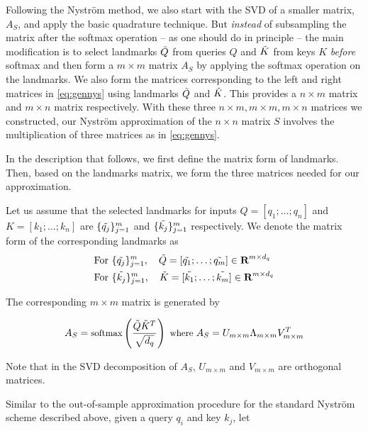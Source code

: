 Following the Nystr\"{o}m method, we also start with the SVD of a smaller matrix, $A_S$, and apply the basic quadrature technique. But {\em instead} of subsampling the matrix after the softmax operation -- as one should do in principle -- the main modification is to select landmarks $\Tilde{Q}$ from queries $Q$ and $\Tilde{K}$ from keys $K$ {\em before} softmax and then form a $m\times m$ matrix $A_S$ by applying the softmax operation on the landmarks. We also form the matrices corresponding to the left and right matrices in \eqref{eq:gennys} 
using landmarks $\Tilde{Q}$ and $\Tilde{K}$. 
This provides a $n\times m$ matrix and $m\times n$ matrix respectively. With these three $n\times m, m \times m, m \times n$ matrices we constructed, our Nystr\"{o}m approximation of the $n\times n$ matrix $S$ involves the multiplication of three matrices as in \eqref{eq:gennys}. 

In the description that follows, we first define the matrix form of landmarks. Then, based on the landmarks matrix, we form the three matrices needed for our approximation.

\begin{definition}
Let us assume that the selected landmarks for inputs $Q = [q_1; \dots; q_n]$ and $K = [k_1; \dots; k_n]$ are $\{\Tilde{q_j}\}_{j = 1}^m$ and $\{\Tilde{k_j}\}_{j = 1}^m$ respectively. We denote the matrix form of the corresponding landmarks as 
\begin{align*}
\small
&\text{For } \{\Tilde{q_j}\}_{j = 1}^m, \quad \Tilde{Q} = [\Tilde{q_1}; \dots; \Tilde{q_m}] \in \textbf{R}^{m \times d_q}\\
&\text{For } \{\Tilde{k_j}\}_{j = 1}^m, \quad \Tilde{K} = [\Tilde{k_1}; \dots; \Tilde{k_m}] \in \textbf{R}^{m \times d_q}    
\end{align*}
\end{definition}

 

The corresponding $m\times m$ matrix is generated by

\begin{equation*}
\small
A_S = \text{softmax}\left(\frac{\Tilde{Q}\Tilde{K}^T}{\sqrt{d_q}} \right) 
\text{ where } A_S = U_{m \times m} \Lambda_{m \times m} V_{m \times m}^T
\end{equation*}

Note that in the SVD decomposition of $A_S$, 
$U_{m\times m}$ and $V_{m \times m}$ are orthogonal matrices. 

Similar to the out-of-sample approximation procedure for the standard Nystr\"{o}m scheme described above, given a query $q_i$ and key $k_j$, let

